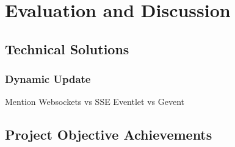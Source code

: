 \chapter{Evaluation and Discussion}

\section{Technical Solutions}
\subsection{Dynamic Update}
Mention Websockets vs SSE
Eventlet vs Gevent

\section{Project Objective Achievements}
